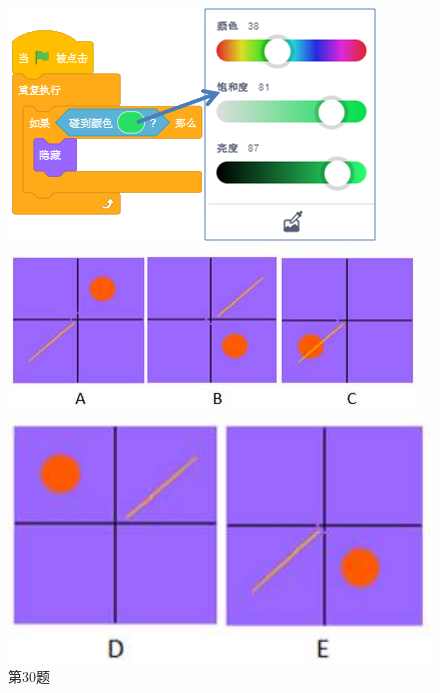 \documentclass[10pt, a4paper]{article}
\begin{document}
\begin{enumerate}
        \begin{figure}[htbp]
            \centering
            \begin{minipage}[t]{.24\textwidth}
                \centering
                \includegraphics[width=\textwidth]{30-3.png}
                \caption*{第30题}
            \end{minipage}
            \begin{minipage}[t]{.4\textwidth}
                \centering
                \begin{minipage}[t]{.55\textwidth}
                    \centering
                    \includegraphics[width=\textwidth]{31-1.jpg}
                \end{minipage}
                \begin{minipage}[t]{.4\textwidth}
                    \centering
                    \includegraphics[width=1\textwidth]{31-2.jpg}

\end{minipage}
\end{minipage}
\end{figure}
\end{enumerate}
\end{document}
